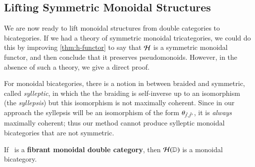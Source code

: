 \documentclass{amsart}
\begin{document}
\subsection{Lifting Symmetric Monoidal Structures}
We are now ready to lift monoidal structures from double categories to
bicategories.  If we had a theory of symmetric monoidal tricategories,
we could do this by improving \autoref{thm:h-functor} to say that
$\mathcal{H}$ is a symmetric monoidal functor, and then conclude that it
preserves pseudomonoids.  However, in the absence of such a theory, we
give a direct proof.

\begin{rmk}\label{rmk:sym}
  For monoidal bicategories, there is a notion in between braided and
  symmetric, called \emph{sylleptic}, in which the the braiding is
  self-inverse up to an isomorphism (the \emph{syllepsis}) but this
  isomorphism is not maximally coherent.  Since in our approach the
  syllepsis will be an isomorphism of the form
  $\theta_{\hat{f},\hat{f}'}$, it is \emph{always} maximally coherent;
  thus our method cannot produce sylleptic monoidal bicategories that
  are not symmetric.
\end{rmk}

\begin{lem}\label{thm:mon11-monbi}
  If \lD\ is a {\bf fibrant monoidal double category}, then $\mathcal{H}(\mathbb{D})$ is a
  monoidal bicategory.  
\end{lem}
\end{document}
